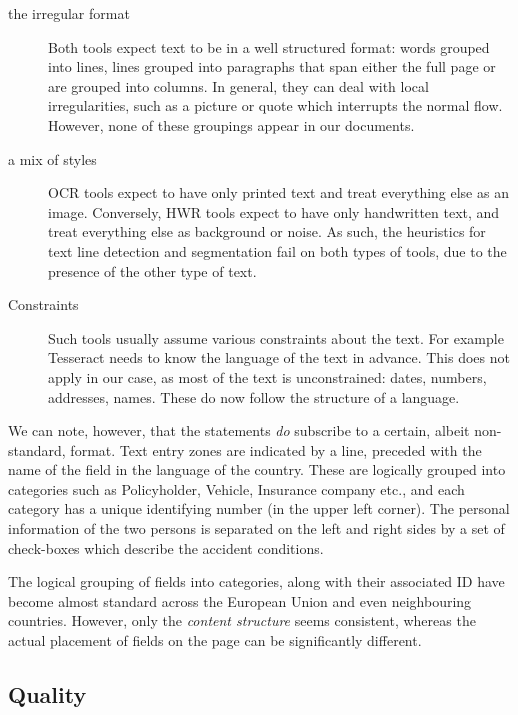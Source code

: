 	\begin{description}
		\item[the irregular format] Both tools expect text to be in a well structured format: words grouped into lines, lines grouped into paragraphs that span either the full page or are grouped into columns. In general, they can deal with local irregularities, such as a picture or quote which interrupts the normal flow. However, none of these groupings appear in our documents.

		\item[a mix of styles] OCR tools expect to have only printed text and treat everything else as an image. Conversely, HWR tools expect to have only handwritten text, and treat everything else as background or noise. As such, the heuristics for text line detection and segmentation fail on both types of tools, due to the presence of the other type of text.

		\item[Constraints] Such tools usually assume various constraints about the text. For example Tesseract needs to know the language of the text in advance. This does not apply in our case, as most of the text is unconstrained: dates, numbers, addresses, names. These do now follow the structure of a language.
	\end{description}

	We can note, however, that the statements \emph{do} subscribe to a certain, albeit non-standard, format. Text entry zones are indicated by a line, preceded with the name of the field in the language of the country. These are logically grouped into categories such as Policyholder, Vehicle, Insurance company etc., and each category has a unique identifying number (in the upper left corner). The personal information of the two persons is separated on the left and right sides by a set of check-boxes which describe the accident conditions.

	The logical grouping of fields into categories, along with their associated ID have become almost standard across the European Union and even neighbouring countries. However, only the \emph{content structure} seems consistent, whereas the actual placement of fields on the page can be significantly different.




\subsection{Quality}

